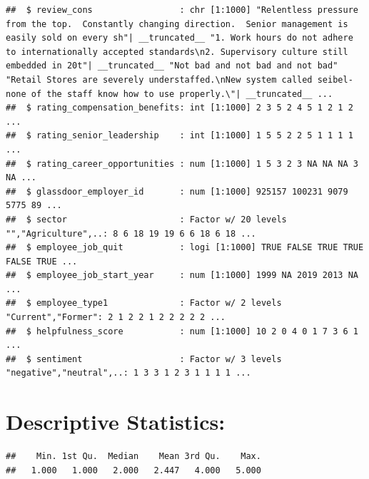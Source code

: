 \documentclass[
]{article}
\newenvironment{Shaded}{\begin{snugshade}}{\end{snugshade}}
\newcommand{\FunctionTok}[1]{\textcolor[rgb]{0.13,0.29,0.53}{\textbf{#1}}}
\newcommand{\NormalTok}[1]{#1}
\newcommand{\SpecialCharTok}[1]{\textcolor[rgb]{0.81,0.36,0.00}{\textbf{#1}}}
\begin{document}
\begin{verbatim}
##  $ review_cons                 : chr [1:1000] "Relentless pressure from the top.  Constantly changing direction.  Senior management is easily sold on every sh"| __truncated__ "1. Work hours do not adhere to internationally accepted standards\n2. Supervisory culture still embedded in 20t"| __truncated__ "Not bad and not bad and not bad" "Retail Stores are severely understaffed.\nNew system called seibel-none of the staff know how to use properly.\"| __truncated__ ...
##  $ rating_compensation_benefits: int [1:1000] 2 3 5 2 4 5 1 2 1 2 ...
##  $ rating_senior_leadership    : int [1:1000] 1 5 5 2 2 5 1 1 1 1 ...
##  $ rating_career_opportunities : num [1:1000] 1 5 3 2 3 NA NA NA 3 NA ...
##  $ glassdoor_employer_id       : num [1:1000] 925157 100231 9079 5775 89 ...
##  $ sector                      : Factor w/ 20 levels "","Agriculture",..: 8 6 18 19 19 6 6 18 6 18 ...
##  $ employee_job_quit           : logi [1:1000] TRUE FALSE TRUE TRUE FALSE TRUE ...
##  $ employee_job_start_year     : num [1:1000] 1999 NA 2019 2013 NA ...
##  $ employee_type1              : Factor w/ 2 levels "Current","Former": 2 1 2 2 1 2 2 2 2 2 ...
##  $ helpfulness_score           : num [1:1000] 10 2 0 4 0 1 7 3 6 1 ...
##  $ sentiment                   : Factor w/ 3 levels "negative","neutral",..: 1 3 3 1 2 3 1 1 1 1 ...
\end{verbatim}

\section{Descriptive Statistics:}\label{descriptive-statistics}

\begin{Shaded}
\end{Shaded}

\begin{verbatim}
##    Min. 1st Qu.  Median    Mean 3rd Qu.    Max. 
##   1.000   1.000   2.000   2.447   4.000   5.000
\end{verbatim}

\begin{Shaded}
\end{Shaded}
\end{document}
